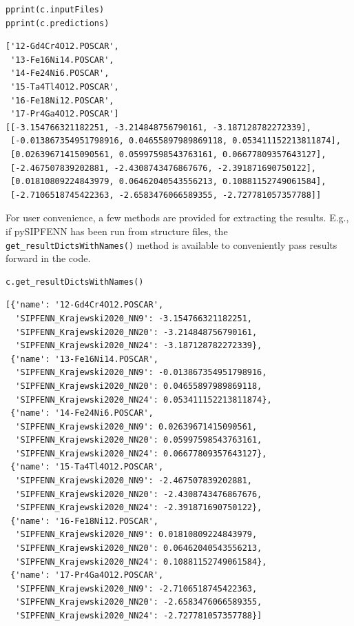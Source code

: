 \begin{verbatim}
pprint(c.inputFiles)
pprint(c.predictions)
\end{verbatim}

\begin{verbatim}
['12-Gd4Cr4O12.POSCAR',
 '13-Fe16Ni14.POSCAR',
 '14-Fe24Ni6.POSCAR',
 '15-Ta4Tl4O12.POSCAR',
 '16-Fe18Ni12.POSCAR',
 '17-Pr4Ga4O12.POSCAR']
[[-3.154766321182251, -3.214848756790161, -3.187128782272339],
 [-0.013867354951798916, 0.04655897989869118, 0.053411152213811874],
 [0.02639671415090561, 0.05997598543763161, 0.06677809357643127],
 [-2.467507839202881, -2.4308743476867676, -2.391871690750122],
 [0.01810809224843979, 0.06462040543556213, 0.10881152749061584],
 [-2.7106518745422363, -2.6583476066589355, -2.727781057357788]]
\end{verbatim}

For user convenience, a few methods are provided for extracting the
results. E.g., if pySIPFENN has been run from structure files, the
\texttt{get\_resultDictsWithNames()} method is
available to conveniently pass results forward in the code.

\begin{verbatim}
c.get_resultDictsWithNames()
\end{verbatim}

\begin{verbatim}
[{'name': '12-Gd4Cr4O12.POSCAR',
  'SIPFENN_Krajewski2020_NN9': -3.154766321182251,
  'SIPFENN_Krajewski2020_NN20': -3.214848756790161,
  'SIPFENN_Krajewski2020_NN24': -3.187128782272339},
 {'name': '13-Fe16Ni14.POSCAR',
  'SIPFENN_Krajewski2020_NN9': -0.013867354951798916,
  'SIPFENN_Krajewski2020_NN20': 0.04655897989869118,
  'SIPFENN_Krajewski2020_NN24': 0.053411152213811874},
 {'name': '14-Fe24Ni6.POSCAR',
  'SIPFENN_Krajewski2020_NN9': 0.02639671415090561,
  'SIPFENN_Krajewski2020_NN20': 0.05997598543763161,
  'SIPFENN_Krajewski2020_NN24': 0.06677809357643127},
 {'name': '15-Ta4Tl4O12.POSCAR',
  'SIPFENN_Krajewski2020_NN9': -2.467507839202881,
  'SIPFENN_Krajewski2020_NN20': -2.4308743476867676,
  'SIPFENN_Krajewski2020_NN24': -2.391871690750122},
 {'name': '16-Fe18Ni12.POSCAR',
  'SIPFENN_Krajewski2020_NN9': 0.01810809224843979,
  'SIPFENN_Krajewski2020_NN20': 0.06462040543556213,
  'SIPFENN_Krajewski2020_NN24': 0.10881152749061584},
 {'name': '17-Pr4Ga4O12.POSCAR',
  'SIPFENN_Krajewski2020_NN9': -2.7106518745422363,
  'SIPFENN_Krajewski2020_NN20': -2.6583476066589355,
  'SIPFENN_Krajewski2020_NN24': -2.727781057357788}]
\end{verbatim}

